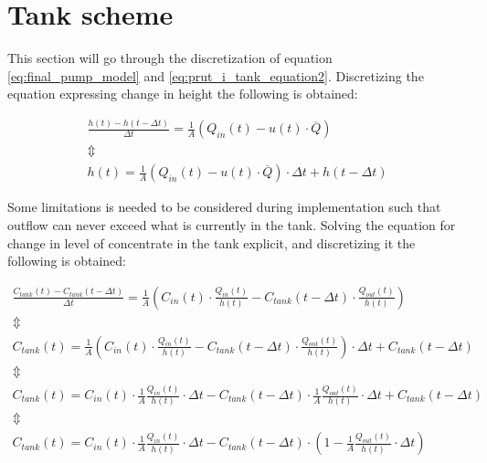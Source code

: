 \section{Tank scheme}\label{sec:tank}

This section will go through the discretization of equation \ref{eq:final_pump_model} and \ref{eq:prut_i_tank_equation2}.
Discretizing the equation expressing change in height the following is obtained:

\begin{equation}\label{eq:disc_tank}
\begin{array}{l}
	\frac{h(t)-h(t-\Delta t)}{\Delta t} = \frac{1}{A} (Q_{in}(t) - u(t)\cdot \overline Q) \\
	\Updownarrow \\
	h(t) = \frac{1}{A} (Q_{in}(t) - u(t)\cdot \overline Q) \cdot \Delta t + h(t-\Delta t)	
\end{array}
\end{equation}

Some limitations is needed to be considered during implementation such that outflow can never exceed what is currently in the tank.
Solving the equation for change in level of concentrate in the tank explicit, and discretizing it the following is obtained:

\begin{equation}\label{eq:disc_con_tank}
\begin{array}{l}
	\frac{C_{tank}(t)-C_{tank}(t-\Delta t)}{\Delta t} = \frac{1}{A} \left(C_{in}(t) \cdot \frac{Q_{in}(t)}{h(t)} - C_{tank}(t - \Delta t) \cdot \frac{Q_{out}(t)}{h(t)} \right) \\
	
	\Updownarrow \\
	
	C_{tank}(t) = \frac{1}{A} \left(C_{in}(t) \cdot \frac{Q_{in}(t)}{h(t)} - C_{tank}(t - \Delta t) \cdot \frac{Q_{out}(t)}{h(t)} \right) \cdot \Delta t + C_{tank}(t-\Delta t) \\

	\Updownarrow \\

	C_{tank}(t) =  C_{in}(t) \cdot \frac{1}{A} \frac{Q_{in}(t)}{h(t)} \cdot \Delta t -  C_{tank}(t - \Delta t) \cdot \frac{1}{A} \frac{Q_{out}(t)}{h(t)} \cdot \Delta t + C_{tank}(t - \Delta t) \\

	\Updownarrow \\

	C_{tank}(t) =   C_{in}(t) \cdot \frac{1}{A} \frac{Q_{in}(t)}{h(t)} \cdot \Delta t -  C_{tank}(t - \Delta t) \cdot \left( 1 - \frac{1}{A} \frac{Q_{out}(t)}{h(t)} \cdot \Delta t \right)

\end{array}
\end{equation}

